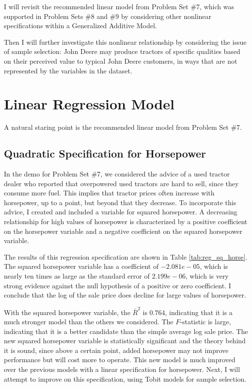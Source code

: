 I will revisit the recommended linear model
from Problem Set \#7, 
which was supported in
Problem Sets \#8 and  \#9 
by considering other nonlinear specifications
within a Generalized Additive Model. 




Then I will further investigate this nonlinear relationship
by considering the issue of sample selection:
John Deere 
may produce 
tractors 
of specific qualities based on
their perceived value to typical 
John Deere 
customers, 
in ways that are not represented by the variables in the dataset.



\clearpage
\section{Linear Regression Model}

A natural staring point is the recommended linear model
from Problem Set \#7. 

\subsection{Quadratic Specification for Horsepower}

In the demo for Problem Set \#7, 
we considered the advice of
a used tractor dealer who reported that overpowered used tractors are hard to sell, since they consume more fuel. 
This implies that tractor prices often increase with horsepower, up to a point, but beyond that they decrease. 
To incorporate this advice, I created and included a variable for squared horsepower. 
A decreasing relationship for high values of horsepower
is characterized by 
a positive coefficient on the horsepower variable and
a negative coefficient on the squared horsepower variable. 

% 

% 
The results of this regression specification are shown in 
Table \ref{tab:reg_sq_horse}. 
%
The squared horsepower variable has a coefficient of $-2.081e-05$, which is nearly ten times as large as the standard error of $2.199e-06$, which is very strong evidence against the null hypothesis of a positive or zero coefficient. 
I conclude that the log of the sale price does decline for large values of horsepower. 


With the squared horsepower variable, the $\bar{R}^2$ is $0.764$, indicating that it is a much stronger model than the others we considered. 
The $F$-statistic is large, indicating that it is a better candidate than the simple average log sale price. 
The new squared horsepower variable is statistically significant and the theory behind it is sound, since above a certain point, added horsepower may not improve performance but will cost more to operate. 
This new model is much improved over the previous models with a linear specification for horsepower.
Next, I will attempt to improve on this specification, 
using Tobit models for sample selection. 


